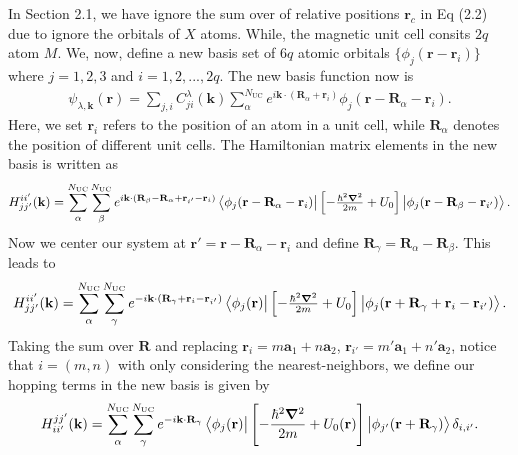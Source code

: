 \documentclass{report}
\newcommand{\f}[2]{\dfrac{#1}{#2}}
\begin{document}
In Section 2.1, we have ignore the sum over of relative positions $\mathbf{r}_{c}$ in Eq (2.2) due to ignore the orbitals of $X$ atoms. While, the magnetic unit cell consits $2q$ atom $M$. We, now, define a new basis set of $6q$ atomic orbitals $\{ \phi_{j}(\mathbf{r} - \mathbf{r}_{i}) \}$ where $j=1,2,3$ and $i = 1,2,...,2q$.
The new basis function now is
\begin{gather}
	\psi_{\lambda,\mathbf{k}}(\mathbf{r}) = \sum_{j,i} C_{ji}^{\lambda}(\mathbf{k}) \sum_{{\alpha}}^{N_{\text{UC}}} e^{i\mathbf{k}\cdot(\mathbf{R}_{\alpha} + \mathbf{r}_{i})} \phi_{j}(\mathbf{r} - \mathbf{R}_{\alpha} - \mathbf{r}_{i}).
\end{gather}
Here, we set $\mathbf{r}_{i}$ refers to the position of an atom in a unit cell, while $\mathbf{R}_{\alpha}$ denotes the position of different unit cells.
The Hamiltonian matrix elements in the new basis is written as
\begin{gather}
	H_{jj'}^{ii'}(\mathbf{k})
	= \sum_{{\alpha}}^{N_\text{UC}}\sum_{{\beta}}^{N_\text{UC}} e^{i \mathbf{k} \cdot (\mathbf{R}_{\beta} - \mathbf{R}_{\alpha} + \mathbf{r}_{i'} - \mathbf{r}_{i})}  \bra{\phi_{j}(\mathbf{r} - \mathbf{R}_{\alpha} - \mathbf{r}_{i})} \left[-\tfrac{\hbar^{2} \boldsymbol{\nabla}^{2}}{2m} + U_{0}\right] \ket{\phi_{j}(\mathbf{r} - \mathbf{R}_{\beta} - \mathbf{r}_{i'})}.
\end{gather}
Now we center our system at $\mathbf{r}'=\mathbf{r} - \mathbf{R}_{\alpha} - \mathbf{r}_{i}$ and define $\mathbf{R}_{\gamma} = \mathbf{R}_{\alpha} - \mathbf{R}_{\beta}$. This leads to
\begin{gather}
	H_{jj'}^{ii'}(\mathbf{k})
	= \sum_{{\alpha}}^{N_\text{UC}}\sum_{{\gamma}}^{N_\text{UC}} e^{-i \mathbf{k} \cdot (\mathbf{R}_{\gamma} + \mathbf{r}_{i} - \mathbf{r}_{i'})}  \bra{\phi_{j}(\mathbf{r})} \left[-\tfrac{\hbar^{2} \boldsymbol{\nabla}^{2}}{2m} + U_{0}\right] \ket{\phi_{j}(\mathbf{r} + \mathbf{R}_{\gamma} + \mathbf{r}_{i} - \mathbf{r}_{i'})}.
\end{gather}
Taking the sum over $\mathbf{R}$ and replacing $\mathbf{r}_{i} = m \mathbf{a}_{1} + n\mathbf{a}_{2} $, $\mathbf{r}_{i'} = m' \mathbf{a}_{1} + n' \mathbf{a}_{2}$, notice that $i = (m,n)$ with only considering the nearest-neighbors, we define our hopping terms in the new basis is given by
\begin{gather}
	H_{ii'}^{jj'}(\mathbf{k}) = \sum_{{\alpha}}^{N_\text{UC}}\sum_{{\gamma}}^{N_\text{UC}} e^{-i \mathbf{k}\cdot \mathbf{R}_{\gamma}} \bra{\phi_{j}(\mathbf{r})} \left[-\f{\hbar^{2} \boldsymbol{\nabla}^{2}}{2m} + U_{0}(\mathbf{r})\right] \ket{\phi_{j'}(\mathbf{r}+\mathbf{R}_{\gamma})}\delta_{i,i'}.
\end{gather}
\end{document}
